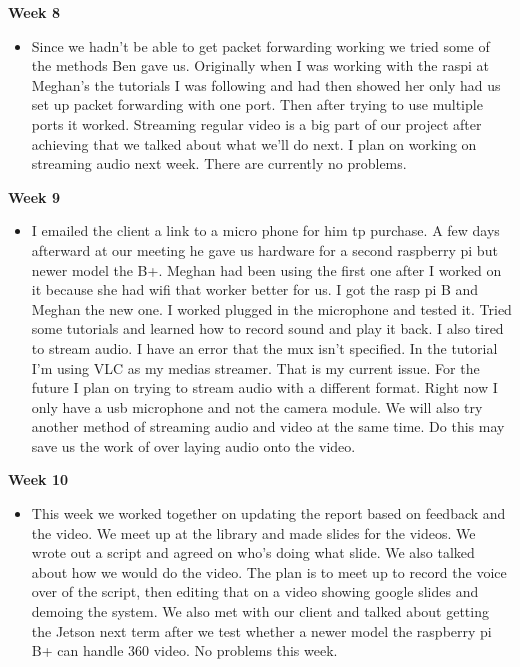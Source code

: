             \textbf{Week 8}
            \begin{itemize}
                \item Since we hadn't be able to get packet forwarding working we tried some of the methods Ben gave us. Originally when I was working with the raspi at Meghan's the tutorials I was following and had then showed her only had us set up packet forwarding with one port. Then after trying to use multiple ports it worked. Streaming regular video is a big part of our project after achieving that we talked about what we'll do next. I plan on working on streaming audio next week. There are currently no problems. 
            \end{itemize}
            
            \textbf{Week 9}
            \begin{itemize}
                \item I emailed the client  a link to a micro phone for him tp purchase. A few days afterward at our meeting he gave us hardware for a second raspberry pi but newer model the B+. Meghan had been using the first one after I worked on it because she had wifi that worker better for us. I got the rasp pi B and Meghan the new one. I worked plugged in the microphone and tested it. Tried some tutorials and learned how to record sound and play it back. I also tired to stream audio. I have an error that the mux isn't specified. In the tutorial I'm using VLC as my medias streamer. That is my current issue. For the future I plan on trying to stream audio with a different format. Right now I only have a usb microphone and not the camera module. We will also try another method of streaming audio and video at the same time. Do this may save us the work of over laying audio onto the video. 
            \end{itemize}
            
            \textbf{Week 10}
            \begin{itemize}
                \item This week we worked together on updating the report based on feedback and the video. We meet up at the library and made slides for the videos. We wrote out a script and agreed on who’s doing what slide. We also talked about how we would do the video. The plan is to meet up to record the voice over of the script, then editing that on a video showing google slides and demoing the system. We also met with our client and talked about getting the Jetson next term after we test whether a newer model the raspberry pi B+ can handle 360 video. No problems this week.  
            \end{itemize}
            
